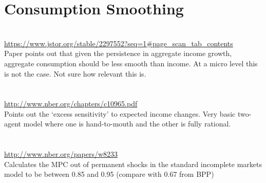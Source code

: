 \documentclass[titlepage,abstract]{econtex}
\begin{document}
\section{Consumption Smoothing}
\cite{campbell_why_1989} \\
\href{url}{https://www.jstor.org/stable/2297552?seq=1\#page\_scan\_tab\_contents} \\
Paper points out that given the persistence in aggregate income growth, aggregate consumption should be less smooth than income. At a micro level this is not the case. Not sure how relevant this is.\\
\\
\cite{campbell_consumption_1989} \\
\href{url}{http://www.nber.org/chapters/c10965.pdf} \\
Points out the `excess sensitivity' to expected income changes. Very basic two-agent model where one is hand-to-mouth and the other is fully rational.\\
\\
\cite{carroll_precautionary_2009} \\
\href{url}{http://www.nber.org/papers/w8233} \\
Calculates the MPC out of permanent shocks in the standard incomplete markets model to be between 0.85 and 0.95 (compare with 0.67 from BPP) \\







%
\end{document}

